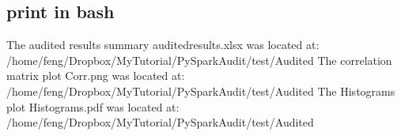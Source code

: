 \documentclass[letterpaper,12pt,english]{sphinxmanual}
\begin{document}
\subsection{print in bash}
\label{\detokenize{demo:print-in-bash}}
%
\begin{sphinxVerbatim}[commandchars=\\\{\}]
The audited results summary audited\PYGZus{}results.xlsx was located at:
/home/feng/Dropbox/MyTutorial/PySparkAudit/test/Audited
The correlation matrix plot Corr.png was located at:
/home/feng/Dropbox/MyTutorial/PySparkAudit/test/Audited
The Histograms plot Histograms.pdf was located at:
/home/feng/Dropbox/MyTutorial/PySparkAudit/test/Audited

\end{sphinxVerbatim}
\end{document}
